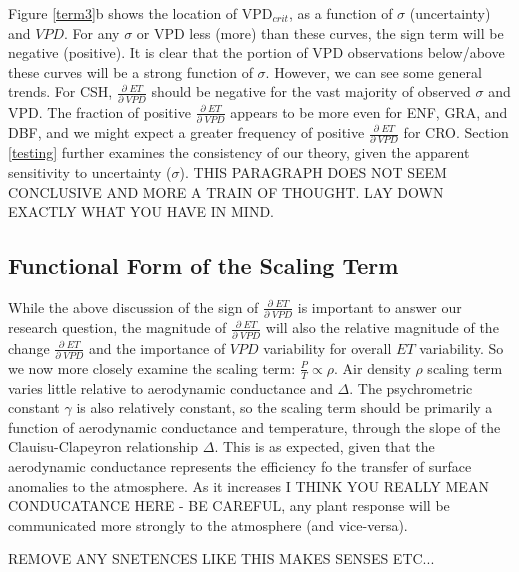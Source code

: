 \documentclass[draft,linenumbers]{agujournal}
\begin{document}
Figure \ref{term3}b shows the location of VPD$_{crit}$, as a function of $\sigma$ (uncertainty) and $VPD$. For any $\sigma$ or VPD less (more) than these curves, the sign term will be negative (positive). It is clear that the portion of VPD observations below/above these curves will be a strong function of $\sigma$. However, we can see some general trends. For CSH, $\frac{\partial \; ET}{\partial \; VPD}$ should be negative for the vast majority of observed $\sigma$ and VPD. The fraction of positive $\frac{\partial \; ET}{\partial \; VPD}$ appears to be more even for ENF, GRA, and DBF, and we might expect a greater frequency of positive $\frac{\partial \; ET}{\partial \; VPD}$ for CRO. Section \ref{testing} further examines the consistency of our theory, given  the apparent sensitivity to uncertainty ($\sigma$). THIS PARAGRAPH DOES NOT SEEM CONCLUSIVE AND MORE A TRAIN OF THOUGHT. LAY DOWN EXACTLY WHAT YOU HAVE IN MIND.


\subsection{Functional Form of the Scaling Term}

While the above discussion of the sign of $\frac{\partial \; ET}{\partial \; VPD}$ is important to answer our research question, the magnitude of $\frac{\partial \; ET}{\partial \; VPD}$ will also the relative magnitude of the change $\frac{\partial \; ET}{\partial \; VPD}$ and the importance of $VPD$ variability for overall $ET$ variability. So we now more closely examine the scaling term: $\frac{P}{T} \propto \rho$. Air density $\rho$ scaling term varies little relative to aerodynamic conductance and $\Delta$. The psychrometric constant $\gamma$ is also relatively constant, so the scaling term should be primarily a function of aerodynamic conductance and temperature, through the slope of the Clauisu-Clapeyron relationship $\Delta$. This is as expected, given that the aerodynamic conductance represents the efficiency fo the transfer of surface anomalies to the atmosphere. As it increases I THINK YOU REALLY MEAN CONDUCATANCE HERE - BE CAREFUL, any plant response will be communicated more strongly to the atmosphere (and vice-versa).

REMOVE ANY SNETENCES LIKE THIS MAKES SENSES ETC...
\end{document}
